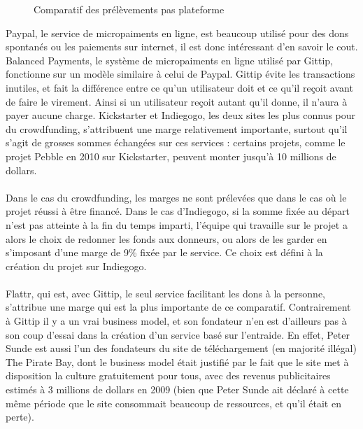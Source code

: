 \begin{figure}[h!]
    \caption{Comparatif des prélèvements pas plateforme}
\end{figure}

Paypal, le service de micropaiments en ligne,  est beaucoup utilisé pour des
dons spontanés ou les paiements sur internet, il est donc intéressant d'en
savoir le cout. Balanced Payments, le système de micropaiments en ligne utilisé
par Gittip, fonctionne sur un modèle similaire à celui de Paypal. Gittip évite
les transactions inutiles, et fait la différence entre ce qu'un utilisateur
doit et ce qu'il reçoit avant de faire le virement. Ainsi si un utilisateur
reçoit autant qu'il donne, il n'aura à payer aucune charge. Kickstarter et
Indiegogo, les deux sites les plus connus pour du  crowdfunding, s'attribuent
une marge relativement importante, surtout qu'il s'agit de grosses sommes
échangées sur ces services : certains projets, comme le projet Pebble en 2010
sur Kickstarter, peuvent monter jusqu'à 10 millions de dollars.

\paragraph{}
Dans le cas du crowdfunding, les marges ne sont prélevées que dans le cas où le
projet réussi à être financé. Dans le cas d'Indiegogo, si la somme fixée au
départ n'est pas atteinte à la fin du temps imparti, l'équipe qui travaille sur
le projet a alors le choix de redonner les fonds aux donneurs, ou alors de les
garder en s'imposant d'une marge de 9\%{} fixée par le service. Ce choix est
défini à la création du projet sur Indiegogo.

\paragraph{}
Flattr, qui est, avec Gittip, le seul service facilitant les dons à la
personne, s'attribue une marge qui est la plus importante de ce comparatif.
Contrairement à Gittip il y a un vrai business model, et son fondateur n'en est
d'ailleurs pas à son coup d'essai dans la création d'un service basé sur
l'entraide. En effet, Peter Sunde est aussi l'un des fondateurs du site de
téléchargement (en majorité illégal) The Pirate Bay, dont le business model
était justifié par le fait que le site met à disposition la culture
gratuitement pour tous, avec des revenus publicitaires estimés à 3 millions de
dollars en 2009 (bien que Peter Sunde ait déclaré à cette même période que le
site consommait beaucoup de ressources, et qu'il était en perte).

